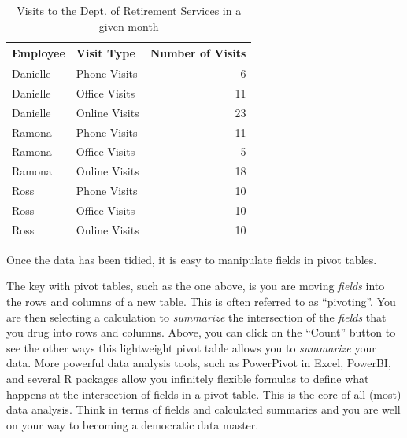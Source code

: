 \documentclass[]{book}
\newenvironment{Shaded}{\begin{snugshade}}{\end{snugshade}}
\newcommand{\DataTypeTok}[1]{\textcolor[rgb]{0.13,0.29,0.53}{#1}}
\newcommand{\KeywordTok}[1]{\textcolor[rgb]{0.13,0.29,0.53}{\textbf{#1}}}
\newcommand{\NormalTok}[1]{#1}
\newcommand{\OperatorTok}[1]{\textcolor[rgb]{0.81,0.36,0.00}{\textbf{#1}}}
\newcommand{\StringTok}[1]{\textcolor[rgb]{0.31,0.60,0.02}{#1}}
\begin{document}
\begin{table}

\caption{\label{tab:unnamed-chunk-9}Visits to the Dept. of Retirement Services in a given month}
\centering
\begin{tabular}[t]{l|l|r}
\hline
Employee & Visit Type & Number of Visits\\
\hline
Danielle & Phone Visits & 6\\
\hline
Danielle & Office Visits & 11\\
\hline
Danielle & Online Visits & 23\\
\hline
Ramona & Phone Visits & 11\\
\hline
Ramona & Office Visits & 5\\
\hline
Ramona & Online Visits & 18\\
\hline
Ross & Phone Visits & 10\\
\hline
Ross & Office Visits & 10\\
\hline
Ross & Online Visits & 10\\
\hline
\end{tabular}
\end{table}

Once the data has been tidied, it is easy to manipulate fields in pivot tables.

\begin{Shaded}
\end{Shaded}

\hypertarget{htmlwidget-dc09c17fca31dc2f0f0b}{}

The key with pivot tables, such as the one above, is you are moving \emph{fields} into the rows and columns of a new table. This is often referred to as ``pivoting''. You are then selecting a calculation to \emph{summarize} the intersection of the \emph{fields} that you drug into rows and columns. Above, you can click on the ``Count'' button to see the other ways this lightweight pivot table allows you to \emph{summarize} your data. More powerful data analysis tools, such as PowerPivot in Excel, PowerBI, and several R packages allow you infinitely flexible formulas to define what happens at the intersection of fields in a pivot table. This is the core of all (most) data analysis. Think in terms of fields and calculated summaries and you are well on your way to becoming a democratic data master.
\end{document}
